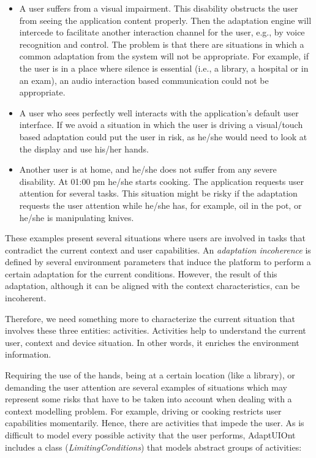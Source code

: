 \begin{itemize}
 \item A user suffers from a visual impairment. This disability obstructs
 the user from seeing the application content properly. Then the adaptation
 engine will intercede to facilitate another interaction channel for the user,
 e.g., by voice recognition and control. The problem is that there are situations
 in which a common adaptation from the system will not be appropriate.
 For example, if the user is in a place where silence is essential (i.e., a
 library, a hospital or in an exam), an audio interaction based communication
 could not be appropriate. 
 
 \item A user who sees perfectly well interacts with the application's
 default user interface. If we avoid a situation in which the user is driving
 a visual/touch based adaptation could put the user in risk, as he/she would
 need to look at the display and use his/her hands.
 
 \item Another user is at home, and he/she does not suffer from any severe
 disability. At 01:00 pm he/she starts cooking. The application requests
 user attention for several tasks. This situation might be risky if the adaptation
 requests the user attention while he/she has, for example, oil in the pot, or
 he/she is manipulating knives.
\end{itemize}

These examples present several situations where users are involved in tasks that
contradict the current context and user capabilities. An \textit{adaptation incoherence} 
is defined by several environment parameters that induce the platform to perform a
certain adaptation for the current conditions. However, the result of this
adaptation, although it can be aligned with the context characteristics, can be
incoherent.

Therefore, we need something more to characterize the current situation that
involves these three entities: activities. Activities help to understand the
current user, context and device situation. In other words, it enriches the
environment information.

Requiring the use of the hands, being at a certain location (like a library), or 
demanding the user attention are several examples of situations which may 
represent some risks that have to be taken into account when dealing with a 
context modelling problem. For example, driving or cooking restricts
user capabilities momentarily. Hence, there are activities that impede the user. 
As is difficult to model every possible activity that the user performs,
AdaptUIOnt includes a class (\textit{LimitingConditions}) that models abstract
groups of activities:

